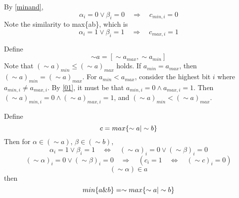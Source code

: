 \documentclass{article}
\begin{document}
By \eqref{minand},
\begin{equation*}
\alpha_i = 0 \vee \beta_i = 0 \quad \Rightarrow \quad c_{min,i} = 0
\end{equation*}
Note the similarity to max\{a\textbar b\}, which is
\begin{equation*}
\alpha_i = 1 \vee \beta_i = 1 \quad \Rightarrow \quad c_{max,i} = 1
\end{equation*}

Define 
\begin{equation*}
\sim a = [\sim a_{max}, \sim a_{min}]
\end{equation*}
Note that $(\sim a)_{min} \le (\sim a)_{max}$ holds. 
If $a_{min} = a_{max}$, then 
$(\sim a)_{min} = (\sim a)_{max}$.
For $a_{min} < a_{max}$, consider the highest bit $i$ where 
$a_{min,i} \ne a_{max,i}$. By \eqref{01}, it must be that 
$a_{min,i} = 0 \wedge a_{max,i} = 1$. 
Then
$(\sim a)_{min,i} = 0 \wedge (\sim a)_{max,i} = 1$, and 
$(\sim a)_{min} < (\sim a)_{max}$. 

Define
\begin{equation*}
c = max\{\sim a \text{\textbar} \sim b\}
\end{equation*}
Then for $\alpha \in (\sim a)$, $\beta \in (\sim b)$,
\begin{equation*}
\alpha_i = 1 \vee \beta_i = 1 \quad \Leftrightarrow \quad 
(\sim \alpha)_i = 0 \vee (\sim \beta)_i = 0
\end{equation*}
\begin{equation*}
(\sim \alpha)_i = 0 \vee (\sim \beta)_i = 0 \quad \Rightarrow \quad 
(c_i = 1 \quad \Leftrightarrow \quad (\sim c)_i = 0)
\end{equation*}
\begin{equation*}
(\sim \alpha) \in a
\end{equation*}
then
\begin{equation}
min\{a\text{\&}b\} = 
\sim max\{\sim a \text{\textbar} \sim b\}
\end{equation}
\end{document}

